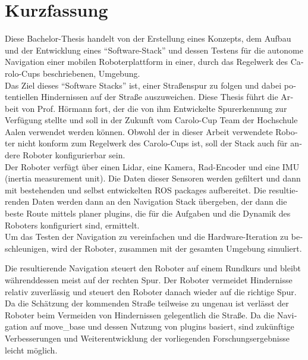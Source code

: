 \chapter*{Kurzfassung}
\label{kurzfassung}

\begin{otherlanguage}{ngerman}
Diese Bachelor-Thesis handelt von der Erstellung eines Konzepts, dem Aufbau und der Entwicklung eines ``Software-Stack'' und dessen Testens für die autonome Navigation einer mobilen Roboterplattform in einer, durch das Regelwerk des Carolo-Cups beschriebenen, Umgebung.\\

Das Ziel dieses ``Software Stacks'' ist, einer Straßenspur zu folgen und dabei potentiellen Hindernissen auf der Straße auszuweichen. Diese Thesis führt die Arbeit von Prof. Hörmann fort, der die von ihm Entwickelte Spurerkennung zur Verfügung stellte und soll in der Zukunft vom Carolo-Cup Team der Hochschule Aalen verwendet werden können. Obwohl der in dieser Arbeit verwendete Roboter nicht konform zum Regelwerk des Carolo-Cups ist, soll der Stack auch für andere Roboter konfigurierbar sein.\\

Der Roboter verfügt über einen Lidar, eine Kamera, Rad-Encoder und eine IMU (inertia measurement unit). Die Daten dieser Sensoren werden gefiltert und dann mit bestehenden und selbst entwickelten ROS packages aufbereitet. Die resultierenden Daten werden dann an den Navigation Stack  übergeben, der dann die beste Route mittels planer plugins, die für die Aufgaben und die Dynamik des Roboters konfiguriert sind, ermittelt.\\

Um das Testen der Navigation zu vereinfachen und die Hardware-Iteration zu beschleunigen, wird der Roboter, zusammen mit der gesamten Umgebung simuliert.

Die resultierende Navigation steuert den Roboter auf einem Rundkurs und bleibt währenddessen meist auf der rechten Spur. Der Roboter vermeidet Hindernisse relativ zuverlässig und steuert den Roboter danach wieder auf die richtige Spur. Da die Schätzung der kommenden Straße teilweise zu ungenau ist verlässt der Roboter beim Vermeiden von Hindernissen gelegentlich die Straße.
Da die Navigation auf move\_base und dessen Nutzung von plugins basiert, sind zukünftige Verbesserungen und Weiterentwicklung der vorliegenden Forschungsergebnisse leicht möglich.

\end{otherlanguage}
